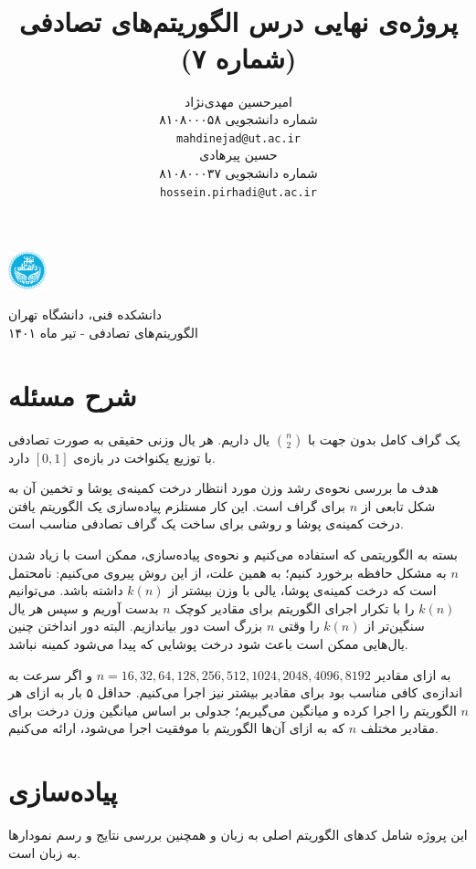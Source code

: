 \documentclass{article}
\title{
\lr{An Exploratory Assignment on Minimum Spanning Trees}\\
پروژه‌ی نهایی درس الگوریتم‌های تصادفی (شماره ۷)
}
\author{%
  امیرحسین مهدی‌نژاد\\
  شماره دانشجویی ۸۱۰۸۰۰۰۵۸\\
  \texttt{mahdinejad@ut.ac.ir} \\
   \And
  حسین پیرهادی\\
  شماره دانشجویی ۸۱۰۸۰۰۰۳۷\\
  \texttt{hossein.pirhadi@ut.ac.ir}
}
\begin{document}
\begin{minipage}{0.1\textwidth}%
\includegraphics[width=1.1cm]{Photos/UT_logo.png}
\end{minipage}%
\hfill%
\begin{minipage}{0.9\textwidth}\raggedleft
دانشکده فنی، دانشگاه تهران\\
الگوریتم‌های تصادفی -  
تیر
ماه ۱۴۰۱\\
\end{minipage}

\makepertitle

\section{شرح مسئله}
یک گراف کامل بدون جهت با
$\binom{n}{2}$
یال داریم.
هر یال وزنی حقیقی به صورت تصادفی با توزیع یکنواخت در بازه‌ی
$\left[0,1\right]$
دارد.

هدف ما بررسی نحوه‌ی رشد وزن مورد انتظار درخت کمینه‌ی پوشا و تخمین آن به شکل تابعی از
$n$
برای گراف است.
این کار مستلزم پیاده‌سازی یک الگوریتم یافتن درخت کمینه‌ی پوشا و روشی برای ساخت یک گراف تصادفی مناسب است.

بسته به الگوریتمی که استفاده می‌کنیم و نحوه‌ی پیاده‌سازی، ممکن است با زیاد شدن
$n$
به مشکل حافظه برخورد کنیم؛ به همین علت، از این روش پیروی می‌کنیم: نامحتمل است که درخت کمینه‌ی پوشا، یالی با وزن بیشتر از
$k(n)$
داشته باشد. می‌توانیم 
$k(n)$
را با تکرار اجرای الگوریتم برای مقادیر کوچک
$n$
بدست آوریم و سپس هر یال سنگین‌تر از
$k(n)$
را وقتی
$n$
بزرگ است دور بیاندازیم. البته دور انداختن چنین یال‌هایی ممکن است باعث شود درخت پوشایی که پیدا می‌شود کمینه نباشد.

به ازای مقادیر
$n=16, 32, 64, 128, 256, 512, 1024, 2048, 4096, 8192$
و اگر سرعت به اندازه‌ی کافی مناسب بود برای مقادیر بیشتر نیز اجرا می‌کنیم.
حداقل ۵ بار به ازای هر
$n$
الگوریتم را اجرا کرده و میانگین می‌گیریم؛ جدولی بر اساس میانگین وزن درخت برای مقادیر مختلف
$n$
که به ازای آن‌ها الگوریتم با موفقیت اجرا می‌شود، ارائه می‌کنیم.
\section{پیاده‌سازی}
این پروژه شامل کدهای الگوریتم اصلی به زبان
و همچنین بررسی نتایج و رسم نمودارها به زبان
است.
\end{document}
